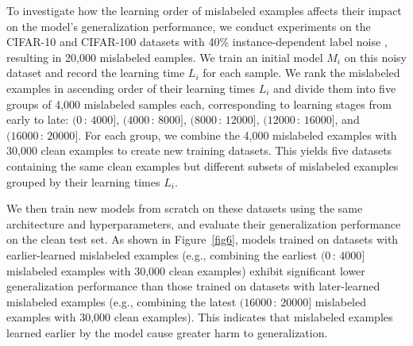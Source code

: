To investigate how the learning order of mislabeled examples affects their impact on the model’s generalization performance, we conduct experiments on the CIFAR-10 and CIFAR-100 datasets \cite{krizhevsky2009learning} with 40\% instance-dependent label noise \cite{xia2020part}, resulting in 20,000 mislabeled eamples. We train an initial model \( M_i \) on this noisy dataset and record the learning time \( L_i \) for each sample.
We rank the mislabeled examples in ascending order of their learning times \( L_i \) and divide them into five groups of 4,000 mislabeled samples each, corresponding to learning stages from early to late: \( (0\,:\,4000] \), \( (4000\,:\,8000] \), \( (8000\,:\,12000] \), \( (12000\,:\,16000] \), and \( (16000\,:\,20000] \). For each group, we combine the 4,000 mislabeled examples with 30,000 clean examples to create new training datasets. This yields five datasets containing the same clean examples but different subsets of mislabeled examples grouped by their learning times \( L_i \).

We then train new models from scratch on these datasets using the same architecture and hyperparameters, and evaluate their generalization performance on the clean test set.
As shown in Figure~\ref{fig6}, models trained on datasets with earlier-learned mislabeled examples (e.g., combining the earliest \( (0\,:\,4000] \) mislabeled examples with 30,000 clean examples) exhibit significant lower generalization performance than those trained on datasets with later-learned mislabeled examples (e.g., combining the latest \( (16000\,:\,20000] \) mislabeled examples with 30,000 clean examples). This indicates that mislabeled examples learned earlier by the model cause greater harm to generalization.


